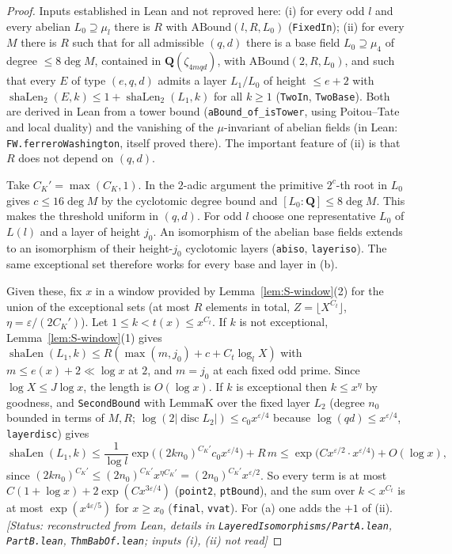 \begin{proof}
Inputs established in Lean and not reproved here: (i) for every odd $l$ and every abelian $L_0\supseteq\mu_l$
there is $R$ with $\mathrm{ABound}(l,R,L_0)$ (\texttt{FixedIn}); (ii) for every $M$ there is $R$ such that for
all admissible $(q,d)$ there is a base field $L_0\supseteq\mu_4$ of degree $\le 8\deg M$, contained in
$\mathbf{Q}(\zeta_{4mqd})$, with $\mathrm{ABound}(2,R,L_0)$, and such that every $E$ of type $(e,q,d)$ admits a layer
$L_1/L_0$ of height $\le e+2$ with $\operatorname{shaLen}_2(E,k)\le1+\operatorname{shaLen}_2(L_1,k)$ for all $k\ge1$
(\texttt{TwoIn}, \texttt{TwoBase}). Both are derived in Lean from a tower bound
(\texttt{aBound\_of\_isTower}, using Poitou--Tate and local duality) and the vanishing of the $\mu$-invariant
of abelian fields \cite{S-FW} (in Lean: \texttt{FW.ferreroWashington}, itself proved there). The important
feature of (ii) is that $R$ does not depend on $(q,d)$.

Take $C_K'=\max(C_K,1)$. In the $2$-adic argument the primitive $2^c$-th root
in $L_0$ gives $c\le16\deg M$ by the cyclotomic degree bound and $[L_0:\mathbf Q]\le8\deg M$.
This makes the threshold uniform in $(q,d)$. For odd $l$ choose one representative $L_0$ of
$L(l)$ and a layer of height $j_0$. An isomorphism of the abelian base fields extends to an
isomorphism of their height-$j_0$ cyclotomic layers (\texttt{abiso}, \texttt{layeriso}).
The same exceptional set therefore works for every base and layer in (b).

Given these, fix $x$ in a window provided by Lemma~\ref{lem:S-window}(2) for the union of the exceptional
sets (at most $R$ elements in total, $Z=\lfloor X^{C_t}\rfloor$, $\eta=\varepsilon/(2C_K')$). Let $1\le k<t(x)\le x^{C_t}$.
If $k$ is not exceptional, Lemma~\ref{lem:S-window}(1) gives
$\operatorname{shaLen}(L_1,k)\le R(\max(m,j_0)+c+C_t\log_l X)$ with $m\le e(x)+2\ll\log x$ at $2$, and $m=j_0$ at each fixed odd prime. Since $\log X\le J\log x$, the
length is $O(\log x)$. If $k$ is exceptional then $k\le x^{\eta}$ by goodness, and \texttt{SecondBound} with
$\mathrm{LemmaK}$ over the fixed layer $L_2$ (degree $n_0$ bounded in terms of $M,R$; $\log(2|\operatorname{disc}L_2|)\le
c_0x^{\varepsilon/4}$ because $\log(qd)\le x^{\varepsilon/4}$, \texttt{layerdisc}) gives
\[
 \operatorname{shaLen}(L_1,k)\le \frac{1}{\log l}\exp\bigl((2kn_0)^{C_K'}c_0x^{\varepsilon/4}\bigr)+R\,m
   \le \exp\bigl(Cx^{\varepsilon/2}\cdot x^{\varepsilon/4}\bigr)+O(\log x),
\]
since $(2kn_0)^{C_K'}\le(2n_0)^{C_K'}x^{\eta C_K'}=(2n_0)^{C_K'}x^{\varepsilon/2}$. So every term is at most
$C(1+\log x)+2\exp(Cx^{3\varepsilon/4})$ (\texttt{point2}, \texttt{ptBound}), and the sum over $k<x^{C_t}$ is at most
$\exp(x^{4\varepsilon/5})$ for $x\ge x_0$ (\texttt{final}, \texttt{vvat}). For (a) one adds the $+1$ of (ii).
\textit{[Status: reconstructed from Lean, details in \texttt{LayeredIsomorphisms/PartA.lean}, \texttt{PartB.lean},
\texttt{ThmBabOf.lean}; inputs (i), (ii) not read]}
\end{proof}

